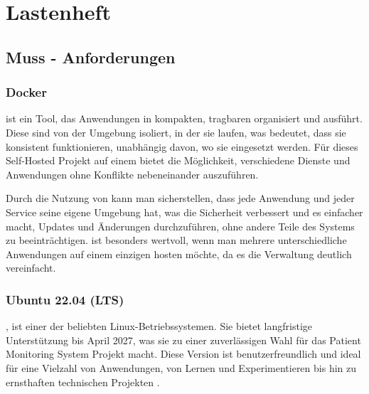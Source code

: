\clearpage

\section{Lastenheft}

\subsection{Muss - Anforderungen}

\subsubsection{Docker}
 ist ein Tool, das Anwendungen in kompakten, tragbaren  organisiert und ausführt. Diese  sind von der Umgebung isoliert, in der sie laufen, was bedeutet, dass sie konsistent funktionieren, unabhängig davon, wo sie eingesetzt werden. Für dieses Self-Hosted Projekt auf einem  bietet  die Möglichkeit, verschiedene Dienste und Anwendungen ohne Konflikte nebeneinander auszuführen.

Durch die Nutzung von  kann man sicherstellen, dass jede Anwendung und jeder Service seine eigene Umgebung hat, was die Sicherheit verbessert und es einfacher macht, Updates und Änderungen durchzuführen, ohne andere Teile des Systems zu beeinträchtigen.  ist besonders wertvoll, wenn man mehrere unterschiedliche Anwendungen auf einem einzigen  hosten möchte, da es die Verwaltung deutlich vereinfacht\cite{Docker}.

\subsubsection{Ubuntu 22.04 (LTS)}
, ist einer der beliebten Linux-Betriebssystemen. Sie bietet langfristige Unterstützung bis April 2027, was sie zu einer zuverlässigen Wahl für das Patient Monitoring System Projekt macht. Diese Version ist benutzerfreundlich und ideal für eine Vielzahl von Anwendungen, von Lernen und Experimentieren bis hin zu ernsthaften technischen Projekten \cite{Ubuntu}.

